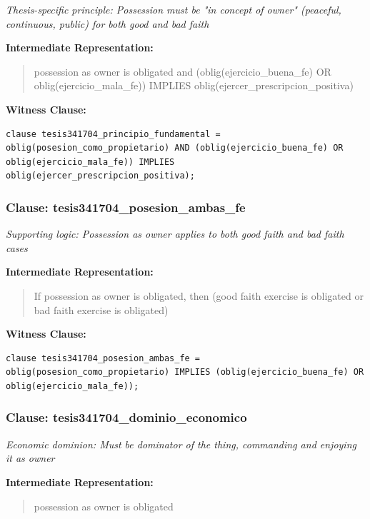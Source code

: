 \documentclass[11pt,a4paper]{article}
\begin{document}
\textit{Thesis-specific principle: Possession must be "in concept of owner" (peaceful, continuous, public) for both good and bad faith}

\textbf{Intermediate Representation:}

\begin{quote}
possession as owner is obligated and (oblig(ejercicio\_buena\_fe) OR oblig(ejercicio\_mala\_fe)) IMPLIES oblig(ejercer\_prescripcion\_positiva)
\end{quote}

\textbf{Witness Clause:}

\begin{lstlisting}[style=witnessstyle, language=Witness]
clause tesis341704_principio_fundamental = oblig(posesion_como_propietario) AND (oblig(ejercicio_buena_fe) OR oblig(ejercicio_mala_fe)) IMPLIES oblig(ejercer_prescripcion_positiva);
\end{lstlisting}

\subsubsection{Clause: tesis341704\_posesion\_ambas\_fe}

\textit{Supporting logic: Possession as owner applies to both good faith and bad faith cases}

\textbf{Intermediate Representation:}

\begin{quote}
If possession as owner is obligated, then (good faith exercise is obligated or bad faith exercise is obligated)
\end{quote}

\textbf{Witness Clause:}

\begin{lstlisting}[style=witnessstyle, language=Witness]
clause tesis341704_posesion_ambas_fe = oblig(posesion_como_propietario) IMPLIES (oblig(ejercicio_buena_fe) OR oblig(ejercicio_mala_fe));
\end{lstlisting}

\subsubsection{Clause: tesis341704\_dominio\_economico}

\textit{Economic dominion: Must be dominator of the thing, commanding and enjoying it as owner}

\textbf{Intermediate Representation:}

\begin{quote}
possession as owner is obligated
\end{quote}
\end{document}
